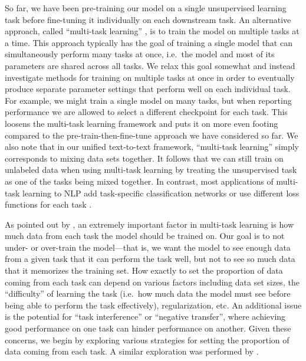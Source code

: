 \documentclass[twoside,11pt]{article}
\begin{document}
So far, we have been pre-training our model on a single unsupervised learning task before fine-tuning it individually on each downstream task.
An alternative approach, called ``multi-task learning'' \citep{ruder2017overview,caruana1997multitask}, is to train the model on multiple tasks at a time.
This approach typically has the goal of training a single model that can simultaneously perform many tasks at once, i.e.\ the model and most of its parameters are shared across all tasks.
We relax this goal somewhat and instead investigate methods for training on multiple tasks at once in order to eventually produce separate parameter settings that perform well on each individual task.
For example, we might train a single model on many tasks, but when reporting performance we are allowed to select a different checkpoint for each task.
This loosens the multi-task learning framework and puts it on more even footing compared to the pre-train-then-fine-tune approach we have considered so far.
We also note that in our unified text-to-text framework, ``multi-task learning'' simply corresponds to mixing data sets together.
It follows that we can still train on unlabeled data when using multi-task learning by treating the unsupervised task as one of the tasks being mixed together.
In contrast, most applications of multi-task learning to NLP add task-specific classification networks or use different loss functions for each task \citep{liu2019multi}.

As pointed out by \cite{arivazhagan2019massively}, an extremely important factor in multi-task learning is how much data from each task the model should be trained on.
Our goal is to not under- or over-train the model---that is, we want the model to see enough data from a given task that it can perform the task well, but not to see so much data that it memorizes the training set.
How exactly to set the proportion of data coming from each task can depend on various factors including data set sizes, the ``difficulty'' of learning the task (i.e.\ how much data the model must see before being able to perform the task effectively), regularization, etc.
An additional issue is the potential for ``task interference'' or ``negative transfer'', where achieving good performance on one task can hinder performance on another.
Given these concerns, we begin by exploring various strategies for setting the proportion of data coming from each task.
A similar exploration was performed by \cite{wang2019can}.
\end{document}
